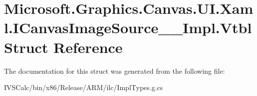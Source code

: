 \hypertarget{struct_microsoft_1_1_graphics_1_1_canvas_1_1_u_i_1_1_xaml_1_1_i_canvas_image_source_____impl_1_1_vtbl}{}\section{Microsoft.\+Graphics.\+Canvas.\+U\+I.\+Xaml.\+I\+Canvas\+Image\+Source\+\_\+\+\_\+\+Impl.\+Vtbl Struct Reference}
\label{struct_microsoft_1_1_graphics_1_1_canvas_1_1_u_i_1_1_xaml_1_1_i_canvas_image_source_____impl_1_1_vtbl}


The documentation for this struct was generated from the following file\+:\begin{DoxyCompactItemize}
\item 
I\+V\+S\+Calc/bin/x86/\+Release/\+A\+R\+M/ilc/Impl\+Types.\+g.\+cs\end{DoxyCompactItemize}

